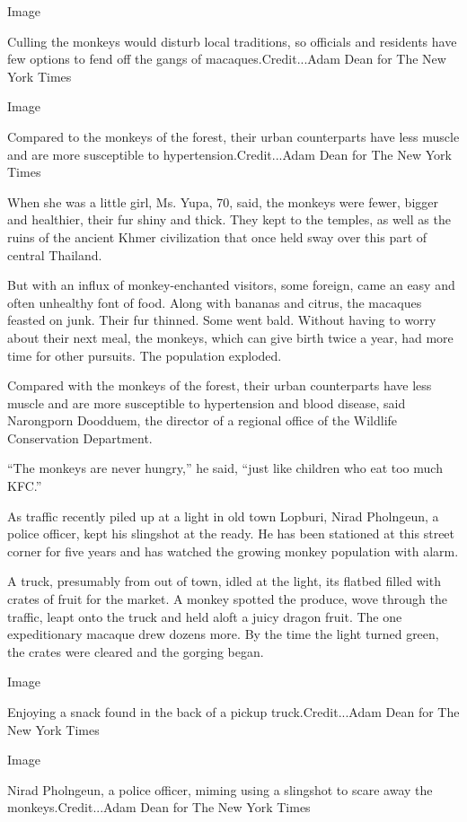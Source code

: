 Image

Culling the monkeys would disturb local traditions, so officials and
residents have few options to fend off the gangs of
macaques.Credit...Adam Dean for The New York Times

Image

Compared to the monkeys of the forest, their urban counterparts have
less muscle and are more susceptible to hypertension.Credit...Adam Dean
for The New York Times

When she was a little girl, Ms. Yupa, 70, said, the monkeys were fewer,
bigger and healthier, their fur shiny and thick. They kept to the
temples, as well as the ruins of the ancient Khmer civilization that
once held sway over this part of central Thailand.

But with an influx of monkey-enchanted visitors, some foreign, came an
easy and often unhealthy font of food. Along with bananas and citrus,
the macaques feasted on junk. Their fur thinned. Some went bald. Without
having to worry about their next meal, the monkeys, which can give birth
twice a year, had more time for other pursuits. The population exploded.

Compared with the monkeys of the forest, their urban counterparts have
less muscle and are more susceptible to hypertension and blood disease,
said Narongporn Doodduem, the director of a regional office of the
Wildlife Conservation Department.

``The monkeys are never hungry,'' he said, ``just like children who eat
too much KFC.''

As traffic recently piled up at a light in old town Lopburi, Nirad
Pholngeun, a police officer, kept his slingshot at the ready. He has
been stationed at this street corner for five years and has watched the
growing monkey population with alarm.

A truck, presumably from out of town, idled at the light, its flatbed
filled with crates of fruit for the market. A monkey spotted the
produce, wove through the traffic, leapt onto the truck and held aloft a
juicy dragon fruit. The one expeditionary macaque drew dozens more. By
the time the light turned green, the crates were cleared and the gorging
began.

Image

Enjoying a snack found in the back of a pickup truck.Credit...Adam Dean
for The New York Times

Image

Nirad Pholngeun, a police officer, miming using a slingshot to scare
away the monkeys.Credit...Adam Dean for The New York Times

